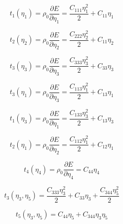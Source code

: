 \documentclass[showpacs,aps,floatfix,prb,reprint,superscriptaddress]{revtex4-1}
\begin{document}
\begin{equation}
\label{eqn:s1} 
t_{1} \left(\eta_{1}\right) = \rho_{0} \frac{\partial E}{\partial \eta_{1}} = \frac{C_{111}\eta_{1}^2}{2} + C_{11}\eta_{1}
\end{equation}

\begin{equation}
\label{eqn:s2} 
t_{2} \left(\eta_{2}\right) = \rho_{0} \frac{\partial E}{\partial \eta_{2}} = \frac{C_{222}\eta_{2}^2}{2} + C_{11}\eta_{2}
\end{equation}

\begin{equation}
\label{eqn:s3} 
t_{3} \left(\eta_{3}\right) = \rho_{0} \frac{\partial E}{\partial \eta_{3}} = \frac{C_{333}\eta_{3}^2}{2} + C_{33}\eta_{3}
\end{equation}

\begin{equation}
\label{eqn:s4} 
t_{3} \left(\eta_{1}\right) = \rho_{0} \frac{\partial E}{\partial \eta_{3}} = \frac{C_{113}\eta_{1}^2}{2} + C_{13}\eta_{1}
\end{equation}

\begin{equation}
\label{eqn:s5} 
t_{1} \left(\eta_{3}\right) = \rho_{0} \frac{\partial E}{\partial \eta_{1}} = \frac{C_{133}\eta_{3}^2}{2} + C_{13}\eta_{3}
\end{equation}

\begin{equation}
\label{eqn:s6} 
t_{2} \left(\eta_{1}\right) = \rho_{0} \frac{\partial E}{\partial \eta_{2}} = \frac{C_{112}\eta_{1}^2}{2} + C_{12}\eta_{1}
\end{equation}

\begin{equation}
\label{eqn:s7} 
t_{4} \left(\eta_{4}\right) = \rho_{0} \frac{\partial E}{\partial \eta_{4}} = C_{44}\eta_{4}
\end{equation}

\begin{equation}
\label{eqn:s8} 
t_{3} \left(\eta_{3}, \eta_{5}\right) = \frac{C_{333}\eta_{3}^2}{2} + C_{33}\eta_{3} + \frac{C_{344}\eta_{5}^2}{2}
\end{equation}

\begin{equation}
\label{eqn:s9} 
t_{5} \left(\eta_{3}, \eta_{5}\right) = C_{44}\eta_{5} + C_{344}\eta_{3}\eta_{5}
\end{equation}

\end{document}
